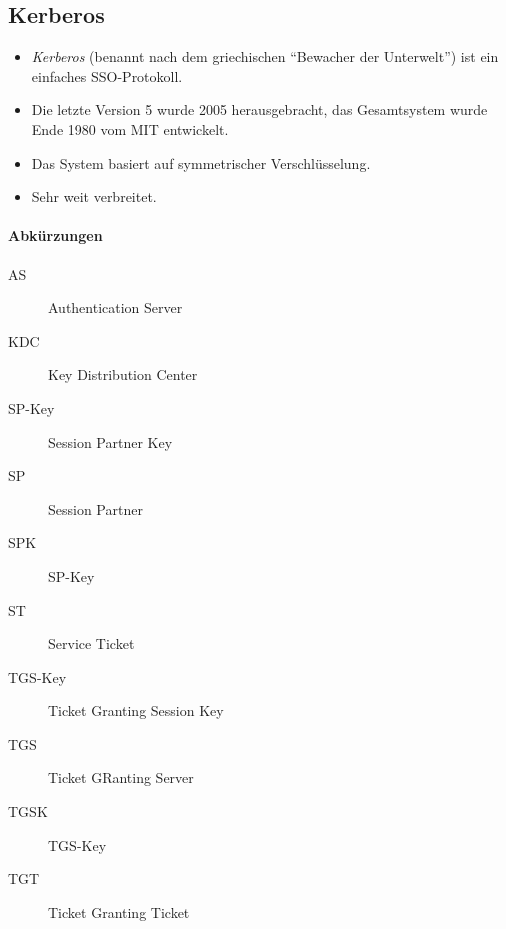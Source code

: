 \documentclass[a4paper, 11pt, accentcolor = tud3b]{tudreport}
\begin{document}
            \subsection{Kerberos}
                \begin{itemize}
                	\item \textit{Kerberos} (benannt nach dem griechischen \enquote{Bewacher der Unterwelt}) ist ein einfaches SSO-Protokoll.
                	\item Die letzte Version 5 wurde 2005 herausgebracht, das Gesamtsystem wurde Ende 1980 vom MIT entwickelt.
                	\item Das System basiert auf symmetrischer Verschlüsselung.
                	\item Sehr weit verbreitet.
                \end{itemize}

	            \paragraph{Abkürzungen}
		            \begin{description}
		            	\item[AS] Authentication Server
		            	\item[KDC] Key Distribution Center
		            	\item[SP-Key] Session Partner Key
		            	\item[SP] Session Partner
		            	\item[SPK] SP-Key
		            	\item[ST] Service Ticket
		            	\item[TGS-Key] Ticket Granting Session Key
		            	\item[TGS] Ticket GRanting Server
		            	\item[TGSK] TGS-Key
		            	\item[TGT] Ticket Granting Ticket
		            \end{description}
\end{document}
